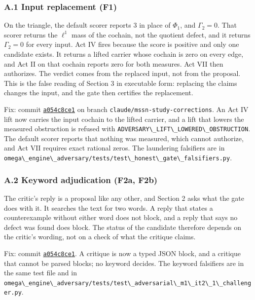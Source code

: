 \documentclass[
  11pt,
]{article}
\newcommand{\passthrough}[1]{#1}
\begin{document}
\hypertarget{a.1-input-replacement-f1}{%
\subsubsection{A.1 Input replacement
(F1)}\label{a.1-input-replacement-f1}}

On the triangle, the default scorer reports 3 in place of \(\Phi_1\),
and \(\Gamma_2 = 0\). That scorer returns the \(\ell^1\) mass of the
cochain, not the quotient defect, and it returns \(\Gamma_2 = 0\) for
every input. Act IV fires because the score is positive and only one
candidate exists. It returns a lifted carrier whose cochain is zero on
every edge, and Act II on that cochain reports zero for both measures.
Act VII then authorizes. The verdict comes from the replaced input, not
from the proposal. This is the false reading of Section 3 in executable
form: replacing the claims changes the input, and the gate then
certifies the replacement.

Fix: commit
\href{https://github.com/dbccpage/the_symbol_game/commit/a054c8ce17c3025ac5518aaeef29096a299519bb}{\passthrough{\lstinline!a054c8ce1!}}
on branch \passthrough{\lstinline!claude/mssn-study-corrections!}. An
Act IV lift now carries the input cochain to the lifted carrier, and a
lift that lowers the measured obstruction is refused with
\passthrough{\lstinline!ADVERSARY\_LIFT\_LOWERED\_OBSTRUCTION!}. The
default scorer reports that nothing was measured, which cannot
authorize, and Act VII requires exact rational zeros. The laundering
falsifiers are in
\passthrough{\lstinline!omega\_engine\_adversary/tests/test\_honest\_gate\_falsifiers.py!}.

\hypertarget{a.2-keyword-adjudication-f2a-f2b}{%
\subsubsection{A.2 Keyword adjudication (F2a,
F2b)}\label{a.2-keyword-adjudication-f2a-f2b}}

The critic's reply is a proposal like any other, and Section 2 asks what
the gate does with it. It searches the text for two words. A reply that
states a counterexample without either word does not block, and a reply
that says no defect was found does block. The status of the candidate
therefore depends on the critic's wording, not on a check of what the
critique claims.

Fix: commit
\href{https://github.com/dbccpage/the_symbol_game/commit/a054c8ce17c3025ac5518aaeef29096a299519bb}{\passthrough{\lstinline!a054c8ce1!}}.
A critique is now a typed JSON block, and a critique that cannot be
parsed blocks; no keyword decides. The keyword falsifiers are in the
same test file and in
\passthrough{\lstinline!omega\_engine\_adversary/tests/test\_adversarial\_m1\_it2\_1\_challenger.py!}.
\end{document}
